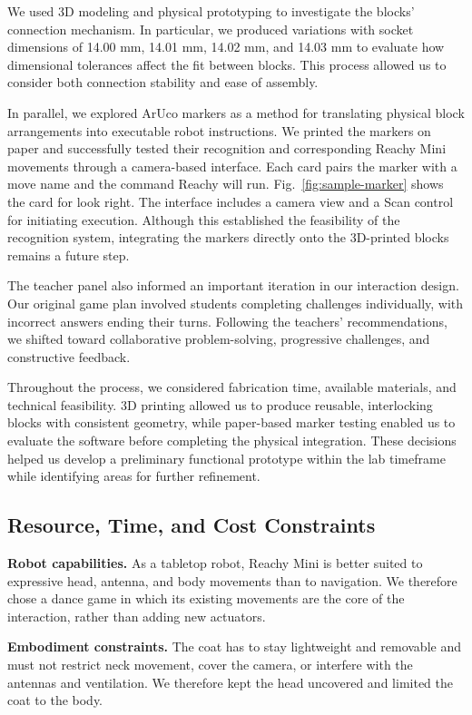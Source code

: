 \documentclass[conference]{IEEEtran}
\begin{document}
We used 3D modeling and physical prototyping to investigate the blocks' connection mechanism. In particular, we produced variations with socket dimensions of 14.00 mm, 14.01 mm, 14.02 mm, and 14.03 mm to evaluate how dimensional tolerances affect the fit between blocks. This process allowed us to consider both connection stability and ease of assembly.

In parallel, we explored ArUco markers as a method for translating physical block arrangements into executable robot instructions. We printed the markers on paper and successfully tested their recognition and corresponding Reachy Mini movements through a camera-based interface. Each card pairs the marker with a move name and the command Reachy will run. Fig.~\ref{fig:sample-marker} shows the card for look right. The interface includes a camera view and a Scan control for initiating execution. Although this established the feasibility of the recognition system, integrating the markers directly onto the 3D-printed blocks remains a future step.

The teacher panel also informed an important iteration in our interaction design. Our original game plan involved students completing challenges individually, with incorrect answers ending their turns. Following the teachers' recommendations, we shifted toward collaborative problem-solving, progressive challenges, and constructive feedback.

Throughout the process, we considered fabrication time, available materials, and technical feasibility. 3D printing allowed us to produce reusable, interlocking blocks with consistent geometry, while paper-based marker testing enabled us to evaluate the software before completing the physical integration. These decisions helped us develop a preliminary functional prototype within the lab timeframe while identifying areas for further refinement.

\subsection{Resource, Time, and Cost Constraints}
\label{sec:constraints}

\textbf{Robot capabilities.} As a tabletop robot, Reachy Mini is better suited to expressive head, antenna, and body movements than to navigation. We therefore chose a dance game in which its existing movements are the core of the interaction, rather than adding new actuators.

\textbf{Embodiment constraints.} The coat has to stay lightweight and removable and must not restrict neck movement, cover the camera, or interfere with the antennas and ventilation. We therefore kept the head uncovered and limited the coat to the body.
\end{document}

